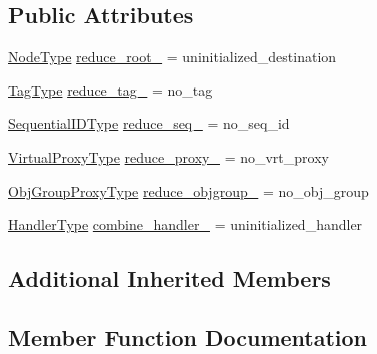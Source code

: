 \subsection*{Public Attributes}
\begin{DoxyCompactItemize}
\item 
\hyperlink{namespacevt_a866da9d0efc19c0a1ce79e9e492f47e2}{Node\+Type} \hyperlink{structvt_1_1collective_1_1reduce_1_1_reduce_msg_a976e38c6642d09d5f171aab8216df6b0}{reduce\+\_\+root\+\_\+} = uninitialized\+\_\+destination
\item 
\hyperlink{namespacevt_a84ab281dae04a52a4b243d6bf62d0e52}{Tag\+Type} \hyperlink{structvt_1_1collective_1_1reduce_1_1_reduce_msg_ae095604d8e87dbd30f0aa0242a624fe8}{reduce\+\_\+tag\+\_\+} = no\+\_\+tag
\item 
\hyperlink{namespacevt_a3063d4db3b879d6dd2c7b8d50995c7f6}{Sequential\+I\+D\+Type} \hyperlink{structvt_1_1collective_1_1reduce_1_1_reduce_msg_a875707afd8d9b7c7925dd8eda8d623e9}{reduce\+\_\+seq\+\_\+} = no\+\_\+seq\+\_\+id
\item 
\hyperlink{namespacevt_a1b417dd5d684f045bb58a0ede70045ac}{Virtual\+Proxy\+Type} \hyperlink{structvt_1_1collective_1_1reduce_1_1_reduce_msg_a12aec73856f05c828d17d17d7178d902}{reduce\+\_\+proxy\+\_\+} = no\+\_\+vrt\+\_\+proxy
\item 
\hyperlink{namespacevt_ad7cae989df485fccca57f0792a880a8e}{Obj\+Group\+Proxy\+Type} \hyperlink{structvt_1_1collective_1_1reduce_1_1_reduce_msg_a193a47361809085ee01211b288e8bb8a}{reduce\+\_\+objgroup\+\_\+} = no\+\_\+obj\+\_\+group
\item 
\hyperlink{namespacevt_af64846b57dfcaf104da3ef6967917573}{Handler\+Type} \hyperlink{structvt_1_1collective_1_1reduce_1_1_reduce_msg_a1265faa9b668a8668148a97f98b75d0d}{combine\+\_\+handler\+\_\+} = uninitialized\+\_\+handler
\end{DoxyCompactItemize}
\subsection*{Additional Inherited Members}


\subsection{Member Function Documentation}
\mbox{\label{structvt_1_1collective_1_1reduce_1_1_reduce_msg_a6f5e84fca312804e6f9ae976947c63de}} 
